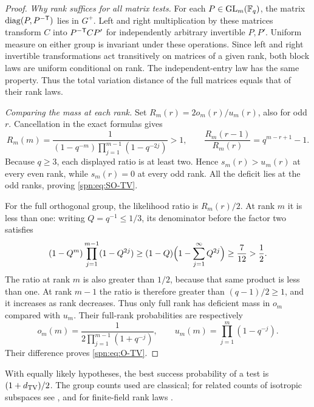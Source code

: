 \begin{proof}
\emph{Why rank suffices for all matrix tests.} For each $P\in\operatorname{GL}_m(\mathbb{F}_q)$,
the matrix $\operatorname{diag}(P,P^{-\mathsf{T}})$ lies in $G^+$. Left and right
multiplication by these matrices transform $C$ into $P^{-\mathsf{T}}CP'$ for
independently arbitrary invertible $P,P'$. Uniform measure on either group is
invariant under these operations. Since left and right invertible
transformations act transitively on matrices of a given rank, both block
laws are uniform conditional on rank. The independent-entry law has the same
property. Thus the total variation distance of the full matrices equals that
of their rank laws.

\emph{Comparing the mass at each rank.} Set $R_m(r)=2o_m(r)/u_m(r)$, also for
odd $r$. Cancellation in the exact formulas gives
\[
 R_m(m)=\frac{1}{(1-q^{-m})\prod_{j=1}^{m-1}(1-q^{-2j})}>1,\qquad
 \frac{R_m(r-1)}{R_m(r)}=q^{m-r+1}-1 .
\]
Because $q\ge3$, each displayed ratio is at least two. Hence
$s_m(r)>u_m(r)$ at every even rank, while $s_m(r)=0$ at every odd rank. All
the deficit lies at the odd ranks, proving \eqref{spn:eq:SO-TV}.

For the full orthogonal group, the likelihood ratio is $R_m(r)/2$. At rank
$m$ it is less than one: writing $Q=q^{-1}\le1/3$, its denominator before the
factor two satisfies
\[
 (1-Q^m)\prod_{j=1}^{m-1}(1-Q^{2j})
 \ge(1-Q)\Bigl(1-\sum_{j=1}^{\infty}Q^{2j}\Bigr)\ge\frac{7}{12}>\frac12 .
\]
The ratio at rank $m$ is also greater than $1/2$, because that same product
is less than one. At rank $m-1$ the ratio is therefore greater than
$(q-1)/2\ge1$, and it increases as rank decreases. Thus only full rank has
deficient mass in $o_m$ compared with $u_m$. Their full-rank probabilities
are respectively
\[
 o_m(m)=\frac{1}{2\prod_{j=1}^{m-1}(1+q^{-j})},\qquad
 u_m(m)=\prod_{j=1}^{m}(1-q^{-j}).
\]
Their difference proves \eqref{spn:eq:O-TV}.
\end{proof}

With equally likely hypotheses, the best success probability of a test is
$(1+d_{\mathrm{TV}})/2$. The group counts used are classical; for related counts of
isotropic subspaces see \cite[Lemma~3.2.2]{Li2022Arithmetic}, and for
finite-field rank laws \cite{Fulman2015Stein}.

